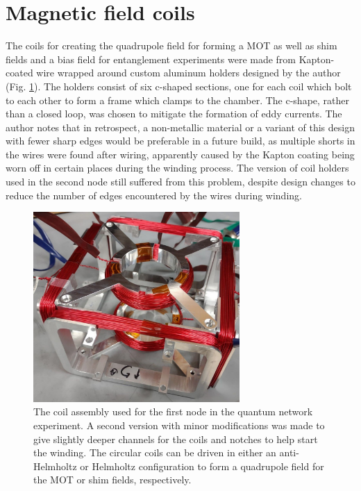 \section{Magnetic field coils}
The coils for creating the quadrupole field for forming a MOT as well as shim fields and a bias field for entanglement experiments were made from Kapton-coated wire wrapped around custom aluminum holders designed by the author (Fig. \ref{fig:node1_coils.pdf}). The holders consist of six c-shaped sections, one for each coil which bolt to each other to form a frame which clamps to the chamber. The c-shape, rather than a closed loop, was chosen to mitigate the formation of eddy currents. The author notes that in retrospect, a non-metallic material or a variant of this design with fewer sharp edges would be preferable in a future build, as multiple shorts in the wires were found after wiring, apparently caused by the Kapton coating being worn off in certain places during the winding process. The version of coil holders used in the second node still suffered from this problem, despite design changes to reduce the number of edges encountered by the wires during winding.

\begin{figure}[h!]
    \centering
    \includegraphics[width=0.7\textwidth]{Images/node1_coils.pdf}
    \caption{The coil assembly used for the first node in the quantum network experiment. A second version with minor modifications was made to give slightly deeper channels for the coils and notches to help start the winding. The circular coils can be driven in either an anti-Helmholtz or Helmholtz configuration to form a quadrupole field for the MOT or shim fields, respectively.}
    \label{fig:node1_coils.pdf}
\end{figure}

